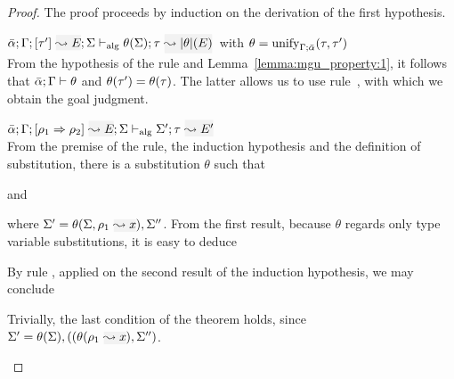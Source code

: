 \begin{proof}
The proof proceeds by induction on the derivation of the first hypothesis.
\begin{description}
\setlength{\itemsep}{1em}
\item[\fbox{\rref{Alg-M-Simp}}]\quad
$\admres{\bar\alpha}{\tenv}{\type'}{E}{\Sigma}{\type}{\etrans\theta(E)}{\theta(\Sigma)}$\
with \(\theta = {\mathrm{unify}_{\Gamma;\bar{\alpha}}(\tau,\tau')}\)
\\


From the hypothesis of the rule and Lemma~\ref{lemma:mgu_property:1}, it follows that
\({\bar\alpha; \Gamma \vdash \theta}\) and $\theta(\tau') = \theta(\tau)$. The latter allows us to use
rule~\rref{M-Simp}, with which we obtain the goal judgment.
\begin{myequation*}
\end{myequation*}

\item[\fbox{\rref{Alg-M-IApp}}]\quad
\(\admres{\bar\alpha}{\tenv}{\rulet_1\To\rulet_2}{E}{\Sigma}{\type}{E'}{\Sigma'}\)\ \\

From the premise of the rule, the induction hypothesis and the definition of substitution,
there is a substitution \(\theta\) such that
\begin{myequation*}
\end{myequation*}
and
\begin{myequation*}
\end{myequation*}
where $\Sigma' = \theta(\Sigma,\ie{\rulet_1}{x}),\Sigma''$.
From the first result, because \(\theta\) regards only type variable substitutions, it is easy to deduce
\begin{myequation*}
  \validsubst{\bar\alpha}{\tenv}{\theta}
\end{myequation*}
By rule , applied on the second result of the induction hypothesis, we may conclude
\begin{myequation*}
\end{myequation*}
Trivially, the last condition of the theorem holds, since $\Sigma' = \theta(\Sigma),((\theta(\ie{\rulet_1}{x}),\Sigma'')$.\\


\end{description}
\end{proof}
